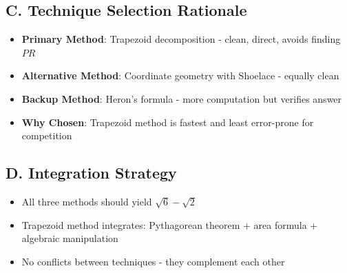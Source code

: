 \documentclass[]{article}
\begin{document}
\begin{techniquesbox}
\subsection*{C. Technique Selection Rationale}
\begin{itemize}[leftmargin=*]
    \item \textbf{Primary Method}: Trapezoid decomposition - clean, direct, avoids finding $PR$
    \item \textbf{Alternative Method}: Coordinate geometry with Shoelace - equally clean
    \item \textbf{Backup Method}: Heron's formula - more computation but verifies answer
    \item \textbf{Why Chosen}: Trapezoid method is fastest and least error-prone for competition
\end{itemize}

\subsection*{D. Integration Strategy}
\begin{itemize}[leftmargin=*]
    \item All three methods should yield $\sqrt{6} - \sqrt{2}$
    \item Trapezoid method integrates: Pythagorean theorem + area formula + algebraic manipulation
    \item No conflicts between techniques - they complement each other
\end{itemize}
\end{techniquesbox}
\end{document}
